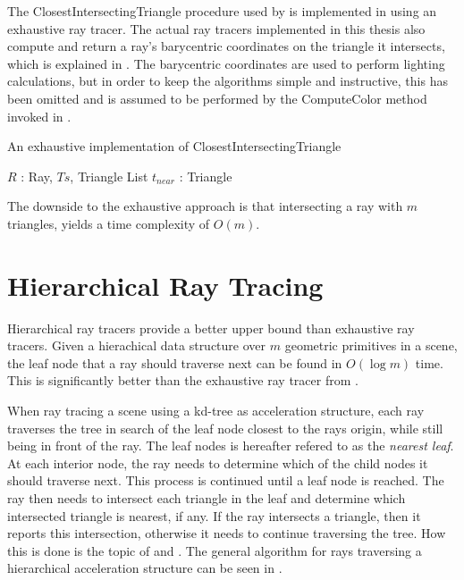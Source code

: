

The ClosestIntersectingTriangle procedure used by 
is implemented in  using an exhaustive ray tracer. The
actual ray tracers implemented in this thesis also compute and return a ray's
barycentric coordinates on the triangle it intersects, which is explained in
. The barycentric coordinates are used to perform
lighting calculations, but in order to keep the algorithms simple and
instructive, this has been omitted and is assumed to be performed by the
ComputeColor method invoked in .


\begin{algorithm}
  \caption{An exhaustive implementation of ClosestIntersectingTriangle}
  \label{alg:exhaustive}
  \begin{algorithmic}
              {$R$ : Ray, $Ts$, Triangle List}
              {$t_{near}$ : Triangle}{
                \ENDFOR
              }
  \end{algorithmic}
\end{algorithm}

The downside to the exhaustive approach is that intersecting a ray with $m$
triangles, yields a time complexity of $O(m)$.

\section{Hierarchical Ray Tracing}\label{sec:hierarchicalTraversal}


Hierarchical ray tracers provide a better upper bound than exhaustive ray
tracers. Given a hierachical data structure over $m$ geometric primitives in a
scene, the leaf node that a ray should traverse next can be found in $O(\log m)$
time. This is significantly better than the exhaustive ray tracer from
.


When ray tracing a scene using a kd-tree as acceleration structure, each ray
traverses the tree in search of the leaf node closest to the rays origin, while
still being in front of the ray. The leaf nodes is hereafter refered to as the
\textit{nearest leaf}. At each interior node, the ray needs to determine which
of the child nodes it should traverse next. This process is continued until a
leaf node is reached. The ray then needs to intersect each triangle in the leaf
and determine which intersected triangle is nearest, if any. If the ray
intersects a triangle, then it reports this intersection, otherwise it needs to
continue traversing the tree. How this is done is the topic of
 and . The general
algorithm for rays traversing a hierarchical acceleration structure can be seen
in .

